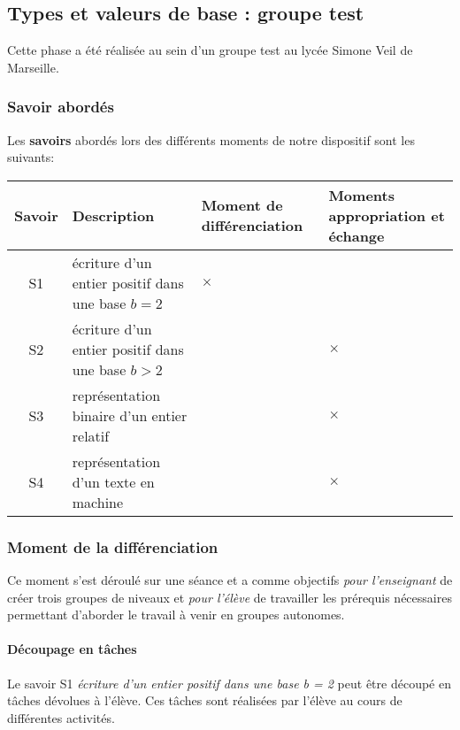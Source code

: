 \newpage

\subsection{Types et valeurs de base : groupe test}


Cette phase a été réalisée au sein d'un groupe test au lycée Simone Veil de Marseille.


\subsubsection{Savoir abordés}

Les \textbf{savoirs} abordés lors des différents moments de notre dispositif sont les suivants:

\begin{tabularx}{\linewidth}{|c|p{6cm}|Y|Y|} \hline
    \bfseries Savoir & \centering\bfseries Description & \bfseries Moment de différenciation & \bfseries Moments appropriation et échange 
    \\ \hline
    S1 & écriture d'un entier positif dans une base $b=2$ & $\times$ & 
    \\ \hline
    S2 & écriture d'un entier positif dans une base $b>2$ & & $\times$
    \\ \hline
    S3 & représentation binaire d'un entier relatif & &$\times$
    \\ \hline
    S4 & représentation d'un texte en machine & & $\times$
    \\ \hline
\end{tabularx}



\subsubsection{Moment de la différenciation}


Ce moment s'est déroulé sur une séance et a comme objectifs \emph{pour l'enseignant} de créer trois groupes de niveaux et \emph{pour l'élève} de travailler les prérequis nécessaires permettant d'aborder le travail à venir en groupes autonomes.


\paragraph{Découpage en tâches}
%
Le savoir S1 \emph{écriture d'un entier positif dans
une base b = 2} peut être découpé en tâches dévolues à l'élève. Ces tâches sont réalisées par l'élève au cours de différentes activités.


